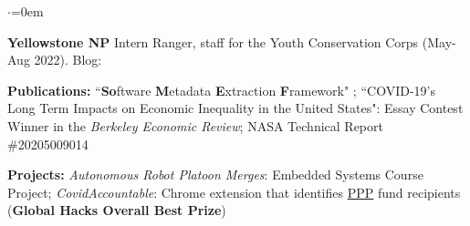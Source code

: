 \begin{list}{$\cdot$}{\leftmargin=0em} %
    \item \textbf{Yellowstone NP} Intern Ranger, staff for the Youth Conservation Corps (May-Aug 2022). Blog: \href{https://yccyellowstone.wixsite.com/2022}{\faExternalLink} 
   \item \textbf{Publications:} ``\textbf{So}ftware \textbf{M}etadata \textbf{E}xtraction \textbf{F}ramework"  \href{https://doi.org/10.1109/BigData47090.2019.9006447}{\faExternalLink}; ``COVID-19's Long Term Impacts on Economic Inequality in the United States": Essay Contest Winner in the \textit{Berkeley Economic Review}; NASA Technical Report \#20205009014 \href{https://ntrs.nasa.gov/api/citations/20205009014/downloads/MaoAllenReportF20.docx.pdf}{\faExternalLink}
   \item \textbf{Projects:} \href{https://www.youtube.com/watch?v=bHS6TTCHuLk}{\faYoutubePlay}\textit{Autonomous Robot Platoon Merges}: Embedded Systems Course Project;
   \textit{CovidAccountable}: Chrome extension that identifies \href{https://web.archive.org/web/20200903224716/https://www.sba.gov/funding-programs/loans/coronavirus-relief-options/paycheck-protection-program}{PPP} fund recipients (\textbf{Global Hacks Overall Best Prize})%
\end{list}
